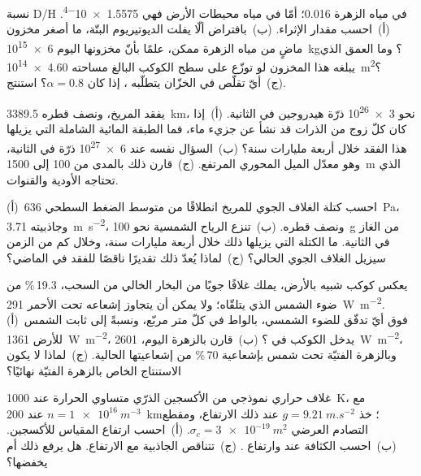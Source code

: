 \begin{exercise}[$\star\star$]\label{exo:b3:planetary-atmospheres:6}
نسبة D/H في مياه الزهرة \num{0.016}؛ أمّا في مياه محيطات الأرض فهي
\num{1.5575e-4}. (أ)~احسب مقدار الإثراء. (ب)~بافتراض ألّا يفلت الديوتيريوم البتّة، ما أصغر
مخزون ماضٍ من مياه الزهرة ممكن، علمًا بأنّ مخزونها اليوم \qty{6e15}{kg}؟ وما العمق الذي
يبلغه هذا المخزون لو توزّع على سطح الكوكب البالغ مساحته \qty{4.60e14}{m^2}؟ (ج)~أيّ
تقلّص في الخزّان يتطلّبه ، إذا كان $\alpha = 0.8$؟
استنتج.
\end{exercise}

\begin{exercise}[$\star\star$]\label{exo:b3:planetary-atmospheres:7}
يفقد المريخ، ونصف قطره \qty{3389.5}{km}، نحو \num{3e26} ذرّة هيدروجين
في الثانية. (أ)~إذا كان كلّ زوج من الذرات قد نشأ عن جزيء ماء، فما الطبقة
المائية الشاملة التي يزيلها هذا الفقد خلال أربعة مليارات سنة؟
(ب)~السؤال نفسه عند \num{6e27} ذرّة في الثانية، وهو معدّل الميل المحوري
المرتفع. (ج)~قارن ذلك بالمدى من 100 إلى \qty{1500}{m} الذي تحتاجه الأودية
والقنوات.
\end{exercise}

\begin{exercise}[$\star\star$]\label{exo:b3:planetary-atmospheres:8}
(أ)~احسب كتلة الغلاف الجوي للمريخ انطلاقًا من متوسط
الضغط السطحي \qty{636}{Pa}، وجاذبيته \qty{3.71}{m.s^{-2}}،
ونصف قطره. (ب)~تنزع الرياح الشمسية نحو \qty{100}{g} من الغاز في الثانية.
ما الكتلة التي يزيلها ذلك خلال أربعة مليارات سنة، وخلال كم من الزمن
سيزيل الغلاف الجوي الحالي؟ (ج)~لماذا يُعدّ ذلك تقديرًا ناقصًا للفقد
في الماضي؟
\end{exercise}

\begin{exercise}[$\star\star$]\label{exo:b3:planetary-atmospheres:9}
يعكس كوكب شبيه بالأرض، يملك غلافًا جويًا من البخار الخالي من السحب، 19.3\,\%
من ضوء الشمس الذي يتلقّاه؛ ولا يمكن أن يتجاوز إشعاعه تحت الأحمر
\qty{291}{W.m^{-2}}. (أ)~فوق أيّ تدفّق للضوء الشمسي، بالواط في كلّ متر
مربّع، ونسبةً إلى ثابت الشمس للأرض \qty{1361}{W.m^{-2}}، يدخل الكوكب في ؟
(ب)~قارن بالزهرة اليوم، \qty{2601}{W.m^{-2}}، وبالزهرة الفتيّة
تحت شمس بإشعاعية 70\,\% من إشعاعيتها الحالية. (ج)~لماذا لا يكون
الاستنتاج الخاص بالزهرة الفتيّة نهائيًا؟
\end{exercise}

\begin{exercise}[$\star\star\star$]\label{exo:b3:planetary-atmospheres:10}
غلاف حراري نموذجي من الأكسجين الذرّي متساوي الحرارة عند \qty{1000}{K}، مع
$n = \qty{1e16}{m^{-3}}$ عند \qty{200}{km}؛ خذ $g =
\qty{9.21}{m.s^{-2}}$ عند ذلك الارتفاع، ومقطع التصادم العرضي
$\sigma_c = \qty{3e-19}{m^2}$. (أ)~احسب ارتفاع المقياس للأكسجين.
(ب)~احسب الكثافة عند  وارتفاع .
(ج)~تتناقص الجاذبية مع الارتفاع. هل يرفع ذلك  أم
يخفضها؟
\end{exercise}

